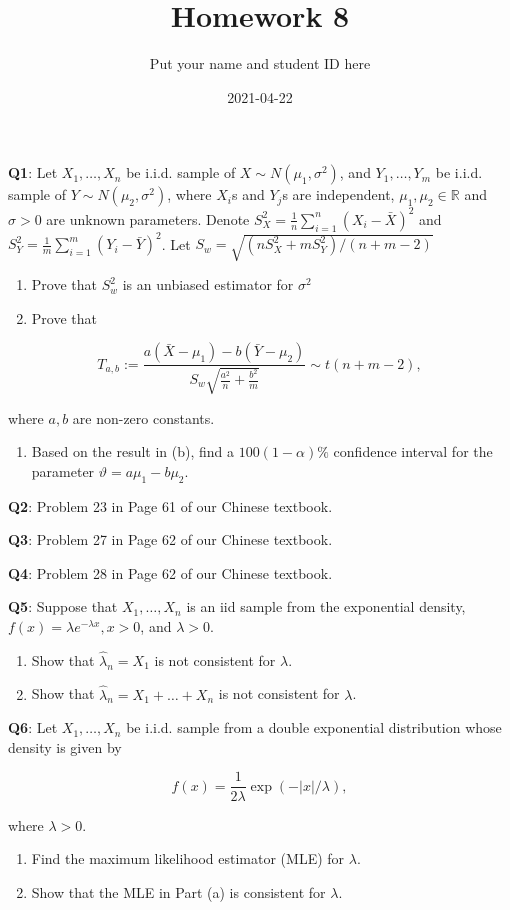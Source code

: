 \documentclass[]{article}
\title{Homework 8}
\author{Put your name and student ID here}
\date{2021-04-22}
\providecommand{\tightlist}{%
  \setlength{\itemsep}{0pt}\setlength{\parskip}{0pt}}
\begin{document}
\maketitle

\textbf{Q1}: Let \(X_1,\dots,X_n\) be i.i.d. sample of
\(X\sim N(\mu_1,\sigma^2)\), and \(Y_1,\dots,Y_m\) be i.i.d. sample of
\(Y\sim N(\mu_2,\sigma^2)\), where \(X_i\)s and \(Y_j\)s are
independent, \(\mu_1,\mu_2\in\mathbb{R}\) and \(\sigma>0\) are unknown
parameters. Denote \(S_X^2 = \frac 1n\sum_{i=1}^n(X_i-\bar X)^2\) and
\(S_Y^2 = \frac 1m\sum_{i=1}^m(Y_i-\bar Y)^2\). Let
\(S_w = \sqrt{(nS_X^2+mS_Y^2)/(n+m-2)}\)

\begin{enumerate}
\def\labelenumi{(\alph{enumi})}
\item
  Prove that \(S_w^2\) is an unbiased estimator for \(\sigma^2\)
\item
  Prove that
\end{enumerate}

\[T_{a,b}:=\frac{a(\bar X-\mu_1)-b(\bar Y-\mu_2)}{S_w\sqrt{\frac{a^2}{n}+\frac{b^2}{m}}}\sim t(n+m-2),\]

where \(a,b\) are non-zero constants.

\begin{enumerate}
\def\labelenumi{(\alph{enumi})}
\setcounter{enumi}{2}
\tightlist
\item
  Based on the result in (b), find a \(100(1-\alpha)\%\) confidence
  interval for the parameter \(\vartheta = a\mu_1-b\mu_2\).
\end{enumerate}

\textbf{Q2}: Problem 23 in Page 61 of our Chinese textbook.

\textbf{Q3}: Problem 27 in Page 62 of our Chinese textbook.

\textbf{Q4}: Problem 28 in Page 62 of our Chinese textbook.

\textbf{Q5}: Suppose that \(X_1,\dots,X_n\) is an iid sample from the
exponential density, \(f(x)=\lambda e^{-\lambda x},x>0\), and
\(\lambda>0\).

\begin{enumerate}
\def\labelenumi{(\alph{enumi})}
\item
  Show that \(\hat\lambda_n=X_1\) is not consistent for \(\lambda\).
\item
  Show that \(\hat\lambda_n=X_1+\dots+X_n\) is not consistent for
  \(\lambda\).
\end{enumerate}

\textbf{Q6}: Let \(X_1,\dots,X_n\) be i.i.d. sample from a double
exponential distribution whose density is given by

\[f(x) = \frac 1{2 \lambda} \exp(-|x|/\lambda),\]

where \(\lambda>0\).

\begin{enumerate}
\def\labelenumi{(\alph{enumi})}
\item
  Find the maximum likelihood estimator (MLE) for \(\lambda\).
\item
  Show that the MLE in Part (a) is consistent for \(\lambda\).
\end{enumerate}
\end{document}
